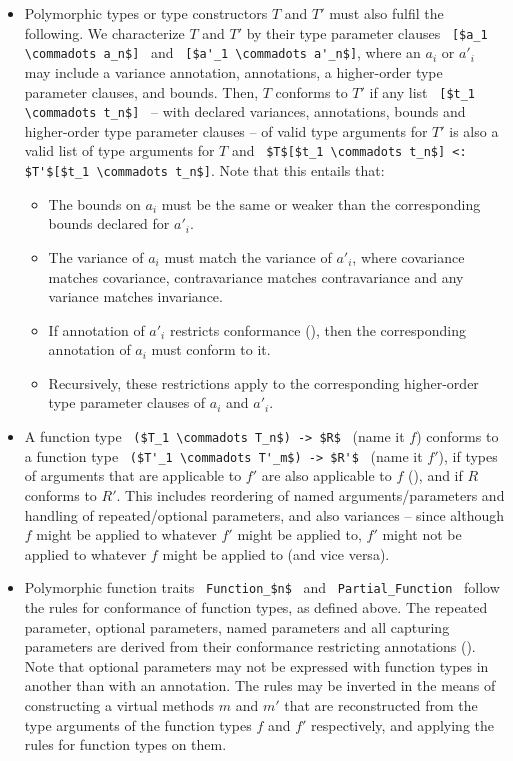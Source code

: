 \begin{itemize}
\item
Polymorphic types or type constructors $T$ and $T'$ must also fulfil the following. We characterize $T$ and $T'$ by their type parameter clauses ~\lstinline![$a_1 \commadots a_n$]!~ and ~\lstinline![$a'_1 \commadots a'_n$]!, where an $a_i$ or $a'_i$ may include a variance annotation, annotations, a higher-order type parameter clauses, and bounds. Then, $T$ conforms to $T'$ if any list ~\lstinline![$t_1 \commadots t_n$]!~ -- with declared variances, annotations, bounds and higher-order type parameter clauses -- of valid type arguments for $T'$ is also a valid list of type arguments for $T$ and ~\lstinline!$T$[$t_1 \commadots t_n$] <: $T'$[$t_1 \commadots t_n$]!. Note that this entails that:
\begin{itemize}
\item The bounds on $a_i$ must be the same or weaker than the corresponding bounds declared for $a'_i$. 
\item The variance of $a_i$ must match the variance of $a'_i$, where covariance matches covariance, contravariance matches contravariance and any variance matches invariance. 
\item If annotation of $a'_i$ restricts conformance (), then the corresponding annotation of $a_i$ must conform to it. 
\item Recursively, these restrictions apply to the corresponding higher-order type parameter clauses of $a_i$ and $a'_i$. 
\end{itemize}

\item 
A function type ~\lstinline!($T_1 \commadots T_n$) -> $R$!~ (name it $f$) conforms to a function type ~\lstinline!($T'_1 \commadots T'_m$) -> $R'$!~ (name it $f'$), if types of arguments that are applicable to $f'$ are also applicable to $f$ (), and if $R$ conforms to $R'$. This includes reordering of named arguments/parameters and handling of repeated/optional parameters, and also variances -- since although $f$ might be applied to whatever $f'$ might be applied to, $f'$ might not be applied to whatever $f$ might be applied to (and vice versa).

\item
Polymorphic function traits ~\lstinline!Function_$n$!~ and ~\lstinline!Partial_Function!~ follow the rules for conformance of function types, as defined above. The repeated parameter, optional parameters, named parameters and all capturing parameters are derived from their conformance restricting annotations (). Note that optional parameters may not be expressed with function types in another than with an annotation. The rules may be inverted in the means of constructing a virtual methods $m$ and $m'$ that are reconstructed from the type arguments of the function types $f$ and $f'$ respectively, and applying the rules for function types on them.
 

\end{itemize}
